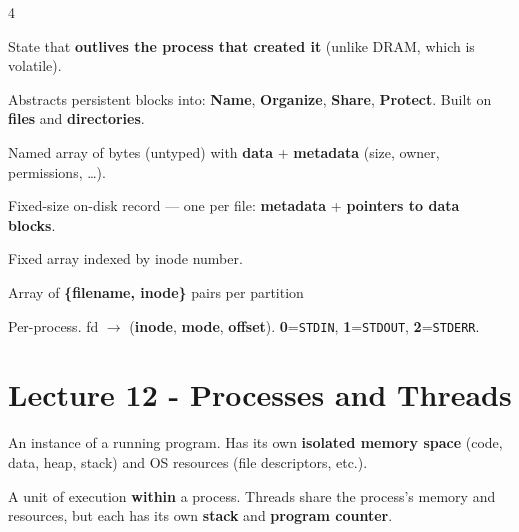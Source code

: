 \documentclass[8pt,a4paper,landscape]{extarticle}
\begin{document}
\begin{multicols*}{4}
\begin{thm}[title=Persistence]
    State that \textbf{outlives the process that created it} (unlike DRAM, which is volatile).
\end{thm}

\begin{prop}[title=File System]
    Abstracts persistent blocks into: \textbf{Name}, \textbf{Organize}, \textbf{Share}, \textbf{Protect}. Built on \textbf{files} and \textbf{directories}.
\end{prop}

\begin{defn}[title=File]
    Named array of bytes (untyped) with \textbf{data} + \textbf{metadata} (size, owner, permissions, \ldots).
\end{defn}

\begin{defn}[title=Inode]
    Fixed-size on-disk record — one per file: \textbf{metadata} + \textbf{pointers to data blocks}.
\end{defn}

\begin{defn}[title=Inode Table]
    Fixed array indexed by inode number.
\end{defn}

\begin{defn}[title=Directory (special file)]
    Array of \textbf{\{filename, inode\}} pairs per partition
\end{defn}

\begin{defn}[title=File Descriptor Table]
    Per-process. fd $\to$ (\textbf{inode}, \textbf{mode}, \textbf{offset}). \quad \textbf{0}=\texttt{STDIN}, \textbf{1}=\texttt{STDOUT}, \textbf{2}=\texttt{STDERR}.
\end{defn}

\section{Lecture 12 - Processes and Threads}

\begin{defn}[title=Process]
    An instance of a running program. Has its own \textbf{isolated memory space} (code, data, heap, stack) and OS resources (file descriptors, etc.).
\end{defn}

\begin{defn}[title=Thread]
    A unit of execution \textbf{within} a process. Threads share the process's memory and resources, but each has its own \textbf{stack} and \textbf{program counter}.
\end{defn}


\end{multicols*}
\end{document}
